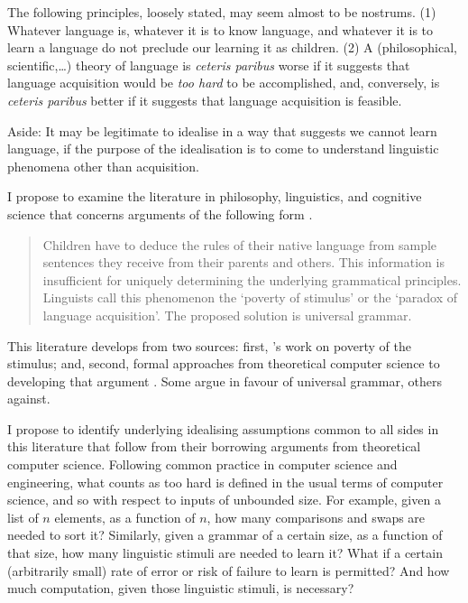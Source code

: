 The following principles, loosely stated, may seem almost to be nostrums. (1) Whatever language is, whatever it is to know language, and whatever it is to learn a language do not preclude our learning it as children. (2) A (philosophical, scientific,…) theory of language is \emph{ceteris paribus} worse if it suggests that language acquisition would be \emph{too hard} to be accomplished, and, conversely, is \emph{ceteris paribus} better if it suggests that language acquisition is feasible.

\begin{small}
Aside: It may be legitimate to idealise in a way that suggests we cannot learn language, if the purpose of the idealisation is to come to understand linguistic phenomena other than acquisition.
\end{small}

I propose to examine the literature in philosophy, linguistics, and cognitive science that concerns arguments of the following form \parencite[114]{nowak2001}.
\begin{quote}
Children have to deduce the rules of their native language from sample sentences they receive from their parents and others. This information is insufficient for uniquely determining the underlying grammatical principles. Linguists call this phenomenon the ‘poverty of stimulus’ or the ‘paradox of language acquisition’. The proposed solution is universal grammar.
\end{quote}

This literature develops from two sources: first, \textcite{chomsky1986}’s work on poverty of the stimulus; and, second, formal approaches from theoretical computer science to developing that argument \parencite[also beginning with the formal work of][and later marshalled into the Chomskyan tradition]{gold1967}. Some \parencite[e.g.][]{nowak2001} argue in favour of universal grammar, others \parencites[e.g.][]{clark2010}{clark2011}{clark2012}{clark2013} against.

I propose to identify underlying idealising assumptions common to all sides in this literature that follow from their borrowing arguments from theoretical computer science. Following common practice in computer science and engineering, what counts as too hard is defined in the usual terms of computer science, and so with respect to inputs of unbounded size. For example, given a list of \(n\) elements, as a function of \(n\), how many comparisons and swaps are needed to sort it? Similarly, given a grammar of a certain size, as a function of that size, how many linguistic stimuli are needed to learn it? What if a certain (arbitrarily small) rate of error or risk of failure to learn is permitted? And how much computation, given those linguistic stimuli, is necessary?


